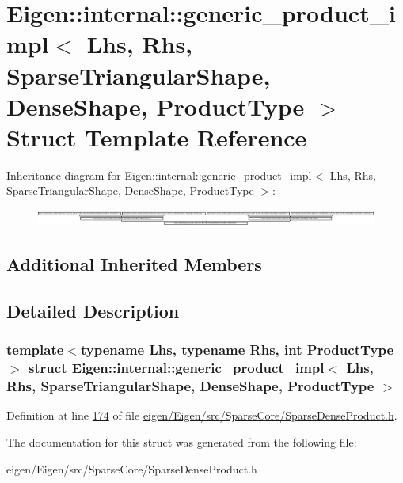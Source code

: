 \hypertarget{struct_eigen_1_1internal_1_1generic__product__impl_3_01_lhs_00_01_rhs_00_01_sparse_triangular_she6f06f29bc806fe3ce6ddd06da00c291}{}\section{Eigen\+:\+:internal\+:\+:generic\+\_\+product\+\_\+impl$<$ Lhs, Rhs, Sparse\+Triangular\+Shape, Dense\+Shape, Product\+Type $>$ Struct Template Reference}
\label{struct_eigen_1_1internal_1_1generic__product__impl_3_01_lhs_00_01_rhs_00_01_sparse_triangular_she6f06f29bc806fe3ce6ddd06da00c291}
Inheritance diagram for Eigen\+:\+:internal\+:\+:generic\+\_\+product\+\_\+impl$<$ Lhs, Rhs, Sparse\+Triangular\+Shape, Dense\+Shape, Product\+Type $>$\+:\begin{figure}[H]
\begin{center}
\leavevmode
\includegraphics[height=0.532995cm]{struct_eigen_1_1internal_1_1generic__product__impl_3_01_lhs_00_01_rhs_00_01_sparse_triangular_she6f06f29bc806fe3ce6ddd06da00c291}
\end{center}
\end{figure}
\subsection*{Additional Inherited Members}


\subsection{Detailed Description}
\subsubsection*{template$<$typename Lhs, typename Rhs, int Product\+Type$>$\newline
struct Eigen\+::internal\+::generic\+\_\+product\+\_\+impl$<$ Lhs, Rhs, Sparse\+Triangular\+Shape, Dense\+Shape, Product\+Type $>$}



Definition at line \hyperlink{eigen_2_eigen_2src_2_sparse_core_2_sparse_dense_product_8h_source_l00174}{174} of file \hyperlink{eigen_2_eigen_2src_2_sparse_core_2_sparse_dense_product_8h_source}{eigen/\+Eigen/src/\+Sparse\+Core/\+Sparse\+Dense\+Product.\+h}.



The documentation for this struct was generated from the following file\+:\begin{DoxyCompactItemize}
\item 
eigen/\+Eigen/src/\+Sparse\+Core/\+Sparse\+Dense\+Product.\+h\end{DoxyCompactItemize}
